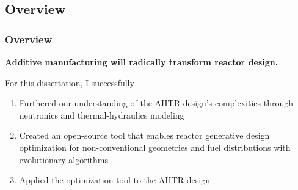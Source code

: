 \subsection{Overview}
    \begin{frame}
        \frametitle{Overview}
        \textbf{Additive manufacturing will radically transform reactor design.}
        \vspace{0.5cm}

        For this dissertation, I successfully
        \begin{enumerate}
            \item Furthered our understanding of the \gls{AHTR} design's complexities 
            through neutronics and thermal-hydraulics modeling
            \item Created an open-source tool that enables reactor generative 
            design optimization for non-conventional geometries and fuel 
            distributions with evolutionary algorithms
            \item Applied the optimization tool to the \gls{AHTR} design 
        \end{enumerate}
    \end{frame}

